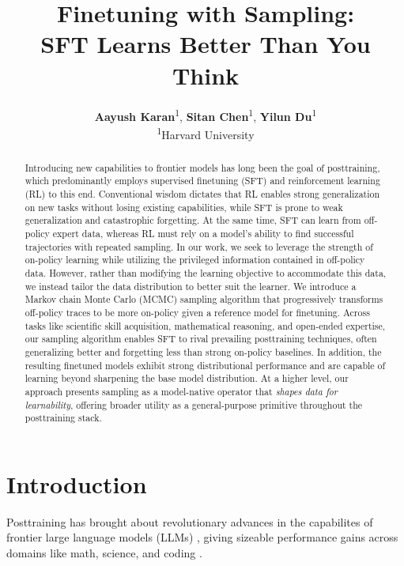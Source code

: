 \documentclass{article}
\author{%
  \textbf{Aayush Karan}\textsuperscript{1},
  \textbf{Sitan Chen}\textsuperscript{1},
  \textbf{Yilun Du}\textsuperscript{1} \\[0.6em]
  \textsuperscript{1}Harvard University \\[0.6em]
  \textbf{\href{https://aakaran.github.io/finetuning_with_sampling/}
     {\textcolor{blue!60!black}{\faGlobe\enspace{Website}}}
    \quad
  \href{https://github.com/aakaran/finetuning-with-sampling}
     {\textcolor{blue!60!black}{\faGithub\enspace{Code}}}}
}
\title{Finetuning with Sampling: \\  SFT Learns Better Than You Think}
\begin{document}
\maketitle


\begin{abstract}


Introducing new capabilities to frontier models has long been the goal of posttraining, which predominantly employs supervised finetuning (SFT) and reinforcement learning (RL) to this end. Conventional wisdom dictates that RL enables strong generalization on new tasks without losing existing capabilities, while SFT is prone to weak generalization and catastrophic forgetting. At the same time, SFT can learn from off-policy expert data, whereas RL must rely on a model's ability to find successful trajectories with repeated sampling. In our work, we seek to leverage the strength of on-policy learning while utilizing the privileged information contained in off-policy data. However, rather than modifying the learning objective to accommodate this data, we instead tailor the data distribution to better suit the learner. We introduce a Markov chain Monte Carlo (MCMC) sampling algorithm that progressively transforms off-policy traces to be more on-policy given a reference model for finetuning. Across tasks like scientific skill acquisition, mathematical reasoning, and open-ended expertise, our sampling algorithm enables SFT to rival prevailing posttraining techniques, often generalizing better and forgetting less than strong on-policy baselines. In addition, the resulting finetuned models exhibit strong distributional performance and are capable of learning beyond sharpening the base model distribution. At a higher level, our approach presents sampling as a model-native operator that \textit{shapes data for learnability}, offering broader utility as a general-purpose primitive throughout the posttraining stack.

\end{abstract}



\section{Introduction}\label{sec:intro}

Posttraining has brought about revolutionary advances in the capabilites of frontier large language models (LLMs) \citep{guo2025deepseekr1, hu2025openreasonerzero}, giving sizeable performance gains across domains like math, science, and coding \citep{hendrycks2021math, li2022alphacode, rein2024gpqa}.  
\end{document}
